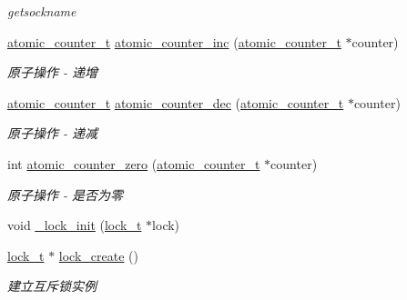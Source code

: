 \begin{DoxyCompactItemize}
\begin{DoxyCompactList}\small\item\em getsockname \end{DoxyCompactList}\item 
\hyperlink{a00051_a0d043bbb6b8db19fea54ab9271d352b6_a0d043bbb6b8db19fea54ab9271d352b6}{atomic\+\_\+counter\+\_\+t} \hyperlink{a00109_gade4f41f1cd519f2719b5114ce7801232_gade4f41f1cd519f2719b5114ce7801232}{atomic\+\_\+counter\+\_\+inc} (\hyperlink{a00051_a0d043bbb6b8db19fea54ab9271d352b6_a0d043bbb6b8db19fea54ab9271d352b6}{atomic\+\_\+counter\+\_\+t} $\ast$counter)
\begin{DoxyCompactList}\small\item\em 原子操作 -\/ 递增 \end{DoxyCompactList}\item 
\hyperlink{a00051_a0d043bbb6b8db19fea54ab9271d352b6_a0d043bbb6b8db19fea54ab9271d352b6}{atomic\+\_\+counter\+\_\+t} \hyperlink{a00109_gafc2df03d75cf9168b72e8c5e11953437_gafc2df03d75cf9168b72e8c5e11953437}{atomic\+\_\+counter\+\_\+dec} (\hyperlink{a00051_a0d043bbb6b8db19fea54ab9271d352b6_a0d043bbb6b8db19fea54ab9271d352b6}{atomic\+\_\+counter\+\_\+t} $\ast$counter)
\begin{DoxyCompactList}\small\item\em 原子操作 -\/ 递减 \end{DoxyCompactList}\item 
int \hyperlink{a00109_ga141897cac9743394a99ff7780daa6a80_ga141897cac9743394a99ff7780daa6a80}{atomic\+\_\+counter\+\_\+zero} (\hyperlink{a00051_a0d043bbb6b8db19fea54ab9271d352b6_a0d043bbb6b8db19fea54ab9271d352b6}{atomic\+\_\+counter\+\_\+t} $\ast$counter)
\begin{DoxyCompactList}\small\item\em 原子操作 -\/ 是否为零 \end{DoxyCompactList}\item 
void \hyperlink{a00082_aeea3ecc7113624673710e5f8570325c7_aeea3ecc7113624673710e5f8570325c7}{\+\_\+lock\+\_\+init} (\hyperlink{a00051_ad3e00e0eb0c79dfd77ff2ff833f49c7d_ad3e00e0eb0c79dfd77ff2ff833f49c7d}{lock\+\_\+t} $\ast$lock)
\item 
\hyperlink{a00051_ad3e00e0eb0c79dfd77ff2ff833f49c7d_ad3e00e0eb0c79dfd77ff2ff833f49c7d}{lock\+\_\+t} $\ast$ \hyperlink{a00082_a0e47279c8c752d22446932673be52e38_a0e47279c8c752d22446932673be52e38}{lock\+\_\+create} ()
\begin{DoxyCompactList}\small\item\em 建立互斥锁实例 \end{DoxyCompactList}\item 

\end{DoxyCompactItemize}
